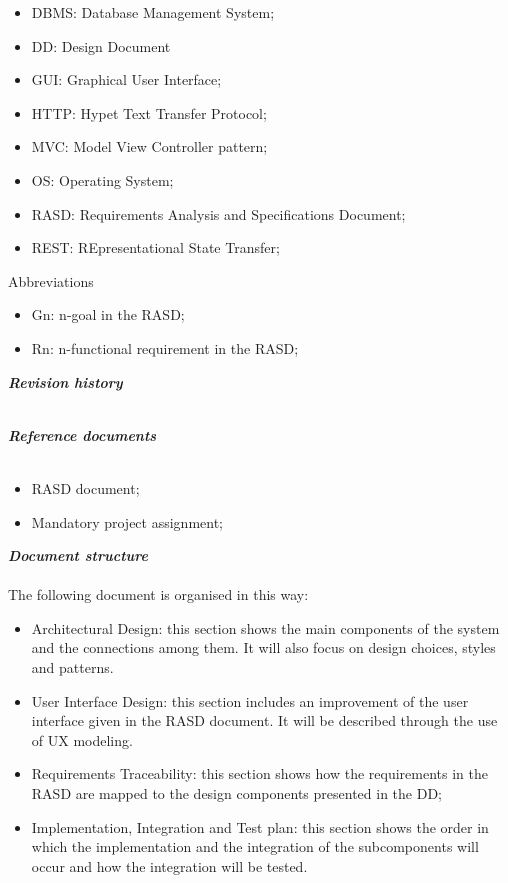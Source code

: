 \begin{legal}
\begin{legal}
\begin{itemize}
					\item DBMS: Database Management System;
					\item DD: Design Document
					\item GUI: Graphical User Interface;
					\item HTTP: Hypet Text Transfer Protocol;
					\item MVC: Model View Controller pattern;
					\item OS: Operating System;
					\item RASD: Requirements Analysis and Specifications Document;
					\item REST: REpresentational State Transfer;
				\end{itemize}
				\item Abbreviations\\
				\begin{itemize}
					\item Gn: n-goal in the RASD;
					\item Rn: n-functional requirement in the RASD;
				\end{itemize}
			\end{legal}
		\item \textit{\textbf{Revision history}}\\\\
		\item \textit{\textbf{Reference documents}}\\\\
			\begin{itemize}
				\item RASD document;
				\item Mandatory project assignment;
			\end{itemize}
		\item \textit{\textbf{Document structure}}\\\\
		The following document is organised in this way:
		\begin{itemize}
				\item Architectural Design: this section shows the main components of the system and the connections among them. It will also focus on design choices, styles and patterns.
				\item User Interface Design: this section includes an improvement of the user interface given in the RASD document. It will be described through the use of UX modeling.
				\item Requirements Traceability: this section shows how the requirements in the RASD are mapped to the design components presented in the DD;
				\item Implementation, Integration and Test plan: this section shows the order in which the implementation and the integration of the subcomponents will occur and how the integration will be tested.
			\end{itemize}
  	\end{legal}

